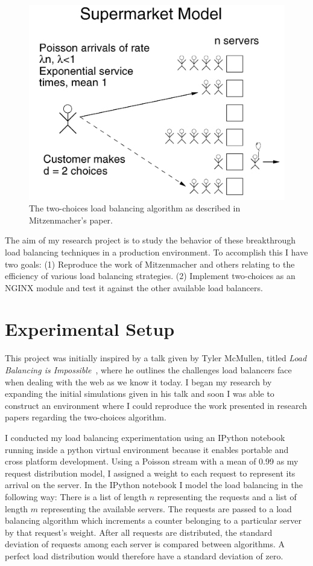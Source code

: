 \begin{figure}
  \includegraphics[width=\linewidth]{figures/supermarket.png}
  \caption{The two-choices load balancing algorithm as described in Mitzenmacher's paper.}
\label{fig:supermarket}
\end{figure}

The aim of my research project is to study the behavior of these
breakthrough load balancing techniques in a production environment. To
accomplish this I have two goals: (1) Reproduce the work of
Mitzenmacher and others relating to the efficiency of various load
balancing strategies. (2) Implement two-choices as an NGINX module and
test it against the other available load balancers.

\section{Experimental Setup}
This project was initially inspired by a talk given by Tyler McMullen,
titled \textit{Load Balancing is Impossible}~\cite{mcmullen}, where he
outlines the challenges load balancers face when dealing with the web
as we know it today. I began my research by expanding the initial
simulations given in his talk and soon I was able to construct an
environment where I could reproduce the work presented in research
papers regarding the two-choices algorithm.

I conducted my load balancing experimentation using an IPython
notebook~\cite{ipython} running inside a python virtual environment
because it enables portable and cross platform development. Using a
Poisson stream with a mean of 0.99 as my request distribution model, I
assigned a weight to each request to represent its arrival on the
server. In the IPython notebook I model the load balancing in the
following way: There is a list of length $n$ representing the requests
and a list of length $m$ representing the available servers. The
requests are passed to a load balancing algorithm which increments a
counter belonging to a particular server by that request's weight.
After all requests are distributed, the standard deviation of requests
among each server is compared between algorithms. A perfect load
distribution would therefore have a standard deviation of zero.

